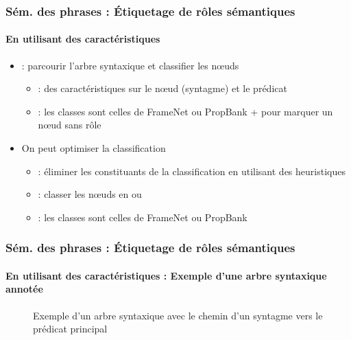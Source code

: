 \documentclass[xcolor=table]{beamer}
\begin{document}
\begin{frame}
	\frametitle{Sém. des phrases : Étiquetage de rôles sémantiques}
	\framesubtitle{En utilisant des caractéristiques}
	
	\begin{itemize}
		\item {} : parcourir l'arbre syntaxique et classifier les nœuds
		\begin{itemize}
			\item {} : des caractéristiques sur le nœud (syntagme) et le prédicat 
			\item {} : les classes sont celles de FrameNet ou PropBank +  pour marquer un nœud sans rôle 
		\end{itemize} 
		\item On peut optimiser la classification
		\begin{itemize}
			\item {} : éliminer les constituants de la classification en utilisant des heuristiques
			\item {} : classer les nœuds en  ou 
			\item {} : les classes sont celles de FrameNet ou PropBank
		\end{itemize} 
	\end{itemize}
	
\end{frame}

\begin{frame}
	\frametitle{Sém. des phrases : Étiquetage de rôles sémantiques}
	\framesubtitle{En utilisant des caractéristiques : Exemple d'une arbre syntaxique annotée}
	
	\vspace{-0.2cm}
	\begin{figure}
		\caption{Exemple d'un arbre syntaxique avec le chemin d'un syntagme vers le prédicat principal \cite{2019-jurafsky-martin}}
	\end{figure}
	
\end{frame}
\end{document}
